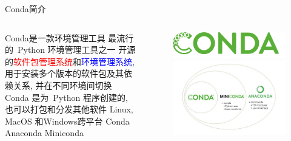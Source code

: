 \begin{frame}{Conda简介}
    \begin{columns}
        \begin{myoutline}
            \1 Conda是一款环境管理工具
                \2 最流行的 Python 环境管理工具之一
                \2 开源的\textcolor{red}{软件包管理系统}和\textcolor{blue}{环境管理系统},
                    \3 用于安装多个版本的软件包及其依赖关系, 并在不同环境间切换
                    \3 Conda 是为 Python 程序创建的, 也可以打包和分发其他软件
                \2 Linux, MacOS 和Windows跨平台
            \1 Conda
                \2 Anaconda
                \2 Miniconda
        \end{myoutline}
        \begin{figure}
            \begin{flushright}
                \includegraphics[width=0.5\linewidth]{Images/conda.jpg}

                \includegraphics[width=0.9\linewidth]{Images/conda-vs-miniconda-vs-anaconda.png}
            \end{flushright}
        \end{figure}
    \end{columns}
\end{frame}


